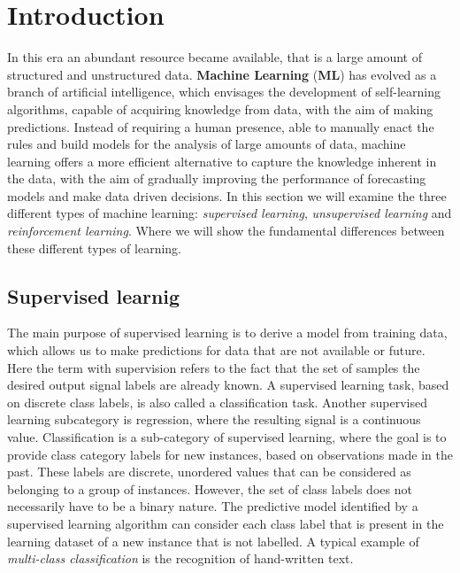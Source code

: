 \section{Introduction}\label{sec:intro}
In this era an abundant resource became available, that is a large amount of
structured and unstructured data.
\textbf{Machine Learning} (\textbf{ML}) has evolved as a branch of artificial
intelligence, which envisages the development of self-learning algorithms,
capable of acquiring knowledge from data, with the aim of making predictions.
Instead of requiring a human presence, able to manually enact the rules and
build models for the analysis of large amounts of data, machine learning offers
a more efficient alternative to capture the knowledge inherent in the data,
with the aim of gradually improving the performance of forecasting models and
make data driven decisions.
In this section we will examine the three different types of machine learning:
\emph{supervised learning}, \emph{unsupervised learning} and
\emph{reinforcement learning}.
Where we will show the fundamental differences between these different types of
learning.\cite{raschka2016machine}

\subsection{Supervised learnig}\label{subsec:supervised-learnig}
The main purpose of supervised learning is to derive a model from 
training data, which allows us to make predictions for data that are not
available or future.
Here the term with supervision refers to the fact that the
set of samples the desired output signal labels are already known.
A supervised learning task, based on discrete class labels, is also called a
classification task.
Another supervised learning subcategory is regression, where the resulting
signal is a continuous value.
Classification is a sub-category of supervised learning, where the goal is to
provide class category labels for new instances, based on observations made in
the past.
These labels are discrete, unordered values ​​that can be considered as
belonging to a group of instances.
However, the set of class labels does not necessarily have to be a binary
nature.
The predictive model identified by a supervised learning algorithm can consider
each class label that is present in the learning dataset of a new instance that
is not labelled.
A typical example of \emph{multi-class classification} is the recognition of
hand-written text.\cite{raschka2016machine}




